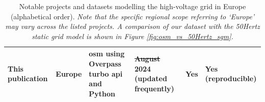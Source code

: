 \documentclass[fleqn,10pt]{wlscirep}
\let\autocite\cite
\providecommand{\DIFaddtex}[1]{{\protect\color{blue}\uwave{#1}}} %
\providecommand{\DIFdeltex}[1]{{\protect\color{red}\sout{#1}}}                      %
\providecommand{\DIFaddFL}[1]{\DIFadd{#1}} %
\providecommand{\DIFdelFL}[1]{\DIFdel{#1}} %
\providecommand{\DIFaddbeginFL}{} %
\providecommand{\DIFaddendFL}{} %
\providecommand{\DIFdelbeginFL}{} %
\providecommand{\DIFdelendFL}{} %
\providecommand{\DIFadd}[1]{\texorpdfstring{\DIFaddtex{#1}}{#1}} %
\providecommand{\DIFdel}[1]{\texorpdfstring{\DIFdeltex{#1}}{}} %
\begin{document}
\begin{table}[!htbp]
\begin{tabular}{|p{2.5cm}|p{2.6cm}|p{3.5cm}|p{3cm}|p{1.5cm}|p{2cm}|}
    \hline
    \bfseries This publication & Europe & \acrshort{osm} using Overpass turbo \acrshort{api} and Python & \DIFdelbeginFL \DIFdelFL{August }\DIFdelendFL \DIFaddbeginFL \DIFaddFL{November }\DIFaddendFL 2024 \newline (updated frequently) &  Yes & Yes \autocite{xiongPrebuiltElectricityNetwork2024} (reproducible)\\
    \hline
    \end{tabular}
    \caption{Notable projects and datasets modelling the high-voltage grid in Europe (alphabetical order). \textit{Note that the specific regional scope referring to `Europe' may vary across the listed projects. A comparison of our dataset with the 50Hertz static grid model is shown in Figure \ref{fig:osm_vs_50Hertz_sgm}.}}
    \label{tab:network_projects}
\end{table}
\end{document}
